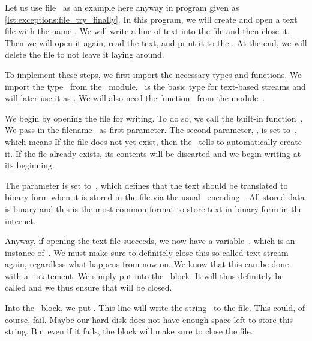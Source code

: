 Let us use file~ as an example here anyway in program  given as \cref{lst:exceptions:file_try_finally}.
In this program, we will create and open a text file with the name .
We will write a line of text into the file and then close it.
Then we will open it again, read the text, and print it to the .
At the end, we will delete the file to not leave it laying around.

To implement these steps, we first import the necessary types and functions.
We import the type~ from the ~module.
~is the basic type for text-based  streams and will later use it as .
We will also need the function~ from the module~.

We begin by opening the file  for writing.
To do so, we call the built-in function~.
We pass in the filename~ as first parameter.
The second parameter, , is set to~, which means 
If the file does not yet exist, then the~ tells  to automatically create it.
If the fle already exists, its contents will be discarted and we begin writing at its beginning.

The parameter  is set to~, which defines that the text should be translated to binary form when it is stored in the file via the usual ~encoding~\cite{RFC3629,ISOIEC106462020ITUCCSU}.
All stored data is binary and this is the most common format to store text in binary form in the internet.

Anyway, if opening the text file succeeds, we now have a variable~, which is an instance of~.
We must make sure to definitely close this so-called text stream again, regardless what happens from now on.
We know that this can be done with a - statement.
We simply put  into the ~block.
It will thus definitely be called and we thus ensure that  will be closed.

Into the ~block, we put .
This line will write the string~ to the file.
This could, of course, fail.
Maybe our hard disk does not have enough space left to store this string.
But even if it fails, the  block will make sure to close the file.

